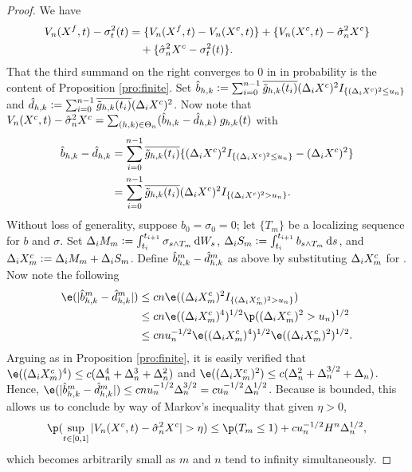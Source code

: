 \begin{proof} 
We have
\begin{align}
V_n(X^f,t)  - \sigma_t^2(t) & = \{V_n(X^f,t)  - V_n(X^c, t)\}  + \{V_n(X^c,t)  - \hat{\sigma}_{n}^2{X^c}\} \notag \\
& \quad +  \{ \hat{\sigma}_{n}^2{X^c} - \sigma_t^2(t)\}. \label{eq:now}
\end{align}
That the third summand on the right converges to 0 in \Ltwo in  probability is the content of Proposition \ref{pro:finite}. 
Set
    $\hat{b}_{h,k} := \sum_{i =0}^{n-1} \overline{\tilde{g}_{h,k}(t_i)} (\Delta_i X^c)^2I_{\{(\Delta_i X^c)^2 \le  u_n\}}$ and  
  $\hat{d}_{h,k} := \sum_{i =0}^{n-1} \overline{\tilde{g}_{h,k}(t_i)} (\Delta_i X^c)^2$.
Now note that
$V_n(X^c,t)  - \hat{\sigma}_{n}^2{X^c} = \sum_{(h,k) \in \Theta_n} (\hat{b}_{h,k}  - \hat{d}_{h,k})\;g_{h,k}(t)$ 
with 
\begin{align}
  \hat{b}_{h,k}  - \hat{d}_{h,k} &= \sum_{i =0}^{n-1} \overline{\tilde{g}_{h,k}(t_i)}\{ (\Delta_i X^c)^2 I_{\{(\Delta_i X^c)^2 \le u_n\}}- (\Delta_i X^c)^2\}\notag\\
  &= \sum_{i =0}^{n-1} \overline{\tilde{g}_{h,k}(t_i)} (\Delta_i X^c)^2 I_{\{(\Delta_i X^c)^2 > u_n\}} \notag.
  \label{}
\end{align} 
Without loss of generality, suppose $b_0 = \sigma_0 = 0$; let $\{T_m\}$ be a localizing sequence for $b$ and $\sigma$.   
Set $\Delta_i M_m := \int_{t_i}^{t_{i+1}} \sigma_{s\wedge T_m} \D W_s$, $\Delta_i S_m := \int_{t_i}^{t_{i+1}} b_{s\wedge T_m} \D s$, and $\Delta_i X^c_m :=  \Delta_i M_m + \Delta_i S_m$. Define $\hat{b}^m_{h,k}  - \hat{d}_{h,k}^m$ as above by substituting $\Delta_i X^c_m$ for \dxc. Now note the following
\begin{align}
  \e(\vert \hat{b}^m_{h,k}  - \dnhk^m \vert ) &\le c n \e( (\dxc_m)^2 I_{\{( \dxc_m)^2 > u_n\}})\notag\\
  & \le c n \e( (\dxc_m)^4)^{1/2}  \p(( \dxc_m)^2 > u_n)^{1/2}\notag\\
  & \le c n u_n^{-1/2} \e( (\dxc_m)^4)^{1/2}  \e(( \dxc_m)^2)^{1/2}\notag.
  \label{}
\end{align}
Arguing as in Proposition \ref{pro:finite}, it is easily verified that $\e( (\dxc_m)^4) \le  c (\Delta_n^4 + \Delta_n^3 + \Delta_n^2)$ and $ \e( (\dxc_m)^2)  \le  c(\Delta_n^2 + \Delta_n^{3/2} + \Delta_n)$. Hence, $\e(\vert \hat{b}^m_{h,k}  - \dnhk^m \vert ) \le c n u_n^{-1/2}\Delta^{3/2}_n = c u_n^{-1/2}\Delta^{1/2}_n $. Because \tghk is bounded, this allows us to conclude by way of Markov's inequality that given $\eta > 0$, 
\begin{align}
  \p(\sup_{t \in \domain} \vert V_n(X^c,t)  - \svn{X^c} \vert > \eta) \le \p(T_m \le 1) + c u^{-1/2}_n H^n \Delta_n^{1/2},\notag
  \label{}
\end{align}
which becomes arbitrarily small as $m$ and $n$ tend to infinity simultaneously.


\end{proof}
